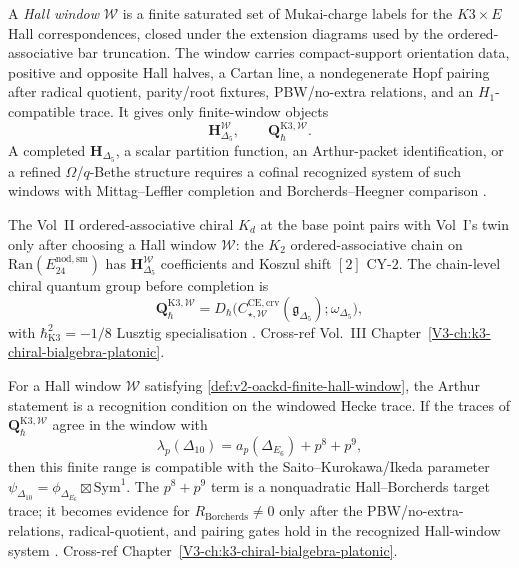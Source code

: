 \begin{definition}
\label{def:v2-oackd-finite-hall-window}
A \emph{Hall window} $\mathcal W$ is a finite saturated set of
Mukai-charge labels for the $K3\times E$ Hall correspondences, closed
under the extension diagrams used by the ordered-associative bar
truncation.  The window carries compact-support orientation data,
positive and opposite Hall halves, a Cartan line, a nondegenerate Hopf
pairing after radical quotient, parity/root fixtures, PBW/no-extra
relations, and an $H_1$-compatible trace.  It gives only finite-window
objects
\[
\mathbf H_{\Delta_5}^{\mathcal W},\qquad
\mathbf Q_{\hbar}^{\mathrm{K3},\mathcal W}.
\]
A completed $\mathbf H_{\Delta_5}$, a scalar partition function, an
Arthur-packet identification, or a refined $\Omega$/$q$-Bethe structure
requires a cofinal recognized system of such windows with
Mittag--Leffler completion and Borcherds--Heegner comparison
\cite{kontsevich-soibelman,PTVV13,BBJ19,MaulikOkounkov12}.
\end{definition}

\begin{remark}
\label{rem:v2-oackd-1}
The Vol~II ordered-associative chiral $K_d$ at the base point
pairs with Vol~I's twin only after choosing a Hall window
$\mathcal W$: the $K_2$ ordered-associative chain on
$\mathrm{Ran}(E^{\mathrm{nod,sm}}_{24})$ has
$\mathbf H_{\Delta_5}^{\mathcal W}$ coefficients and Koszul shift
$[2]$ CY-$2$. The chain-level chiral quantum group before completion is
\[
\mathbf Q^{\mathrm{K3},\mathcal W}_\hbar
=D_\hbar\!\bigl(
C_{\star,\mathcal W}^{\mathrm{CE,crv}}(\mathfrak g_{\Delta_5});
\omega_{\Delta_5}
\bigr),
\]
with $\hbar^2_{\mathrm{K3}} = -1/8$ Lusztig specialisation
\cite{GritsenkoNikulin1998,Borcherds1992}. Cross-ref Vol.~III
Chapter~\ref{V3-ch:k3-chiral-bialgebra-platonic}.
\end{remark}

\begin{remark}
\label{rem:v2-oackd-2}
For a Hall window $\mathcal W$ satisfying
\cref{def:v2-oackd-finite-hall-window}, the Arthur statement is a
recognition condition on the windowed Hecke trace.  If the traces of
$\mathbf Q^{\mathrm{K3},\mathcal W}_\hbar$ agree in the window with
\[
\lambda_p(\Delta_{10}) =
a_p(\Delta_{E_6}) + p^8 + p^9,
\]
then this finite range is compatible with the
Saito--Kurokawa/Ikeda parameter
$\psi_{\Delta_{10}}=\phi_{\Delta_{E_6}}\boxtimes\mathrm{Sym}^1$.
The $p^8+p^9$ term is a nonquadratic Hall--Borcherds target trace; it
becomes evidence for $R_{\mathrm{Borcherds}}\neq0$ only after the
PBW/no-extra-relations, radical-quotient, and pairing gates hold in the
recognized Hall-window system \cite{Andrianov1974,Ikeda2001}. Cross-ref
Chapter~\ref{V3-ch:k3-chiral-bialgebra-platonic}.
\end{remark}

